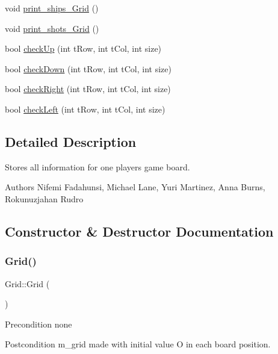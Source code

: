\begin{DoxyCompactItemize}
void \hyperlink{classGrid_a8ae0f29a39c8bb700a20d0e6e865b801}{print\+\_\+ships\+\_\+\+Grid} ()
\item 
void \hyperlink{classGrid_afddc50f6f34ad95f4f860c92fb7cf848}{print\+\_\+shots\+\_\+\+Grid} ()
\item 
bool \hyperlink{classGrid_a54f02f20686c6868a5083a2076af0c60}{check\+Up} (int t\+Row, int t\+Col, int size)
\item 
bool \hyperlink{classGrid_ad2eddab31788809b0a1d4a34f0410ddc}{check\+Down} (int t\+Row, int t\+Col, int size)
\item 
bool \hyperlink{classGrid_a89cf2bde3daca8d048a568e7ee6a9fa2}{check\+Right} (int t\+Row, int t\+Col, int size)
\item 
bool \hyperlink{classGrid_a92d3dec9998340992f02f26dbc5036df}{check\+Left} (int t\+Row, int t\+Col, int size)
\end{DoxyCompactItemize}


\subsection{Detailed Description}
Stores all information for one player\textquotesingle{}s game board. 

\begin{DoxyAuthor}{Authors}
Nifemi Fadahunsi, Michael Lane, Yuri Martinez, Anna Burns, Rokunuzjahan Rudro 
\end{DoxyAuthor}


\subsection{Constructor \& Destructor Documentation}
\mbox{\label{classGrid_a4ac9ff4f63552b4c61ff90fcb35ad66c}} 
\subsubsection{\texorpdfstring{Grid()}{Grid()}}
{\footnotesize\ttfamily Grid\+::\+Grid (\begin{DoxyParamCaption}{ }\end{DoxyParamCaption})}

\begin{DoxyPrecond}{Precondition}
none 
\end{DoxyPrecond}
\begin{DoxyPostcond}{Postcondition}
m\+\_\+grid made with initial value \textquotesingle{}O\textquotesingle{} in each board position. 
\end{DoxyPostcond}
\mbox{\label{classGrid_a3661d0a7f998caaaf8627d7a67072116}} 
